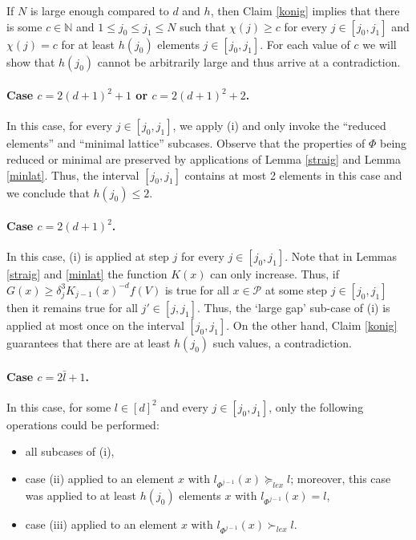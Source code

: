 \documentclass{daj}
\renewcommand{\le}{\leqslant}
\renewcommand{\ge}{\geqslant}
\newcommand{\N}{\mathbb N}
\renewcommand{\P}{\mathcal P}
\theoremstyle{definition}
\theoremstyle{remark}
\theoremstyle{definition}
\theoremstyle{definition}
\begin{document}
If $N$ is large enough compared to $d$ and $h$, then Claim \ref{konig} implies that there is some $c \in \N$ and $1\le j_0 \le j_1 \le N$ such that $\chi(j) \ge c$ for every $j \in [j_0, j_1]$ and $\chi(j) = c$ for at least $h(j_0)$ elements $j \in [j_0, j_1]$. For each value of $c$ we will show that $h(j_0)$ cannot be arbitrarily large and thus arrive at a contradiction. 

\paragraph{Case $c = 2(d+1)^2 +1$ or $c=2(d+1)^2 +2$.} In this case, for every $j \in [j_0, j_1]$, we apply (i) and only invoke the ``reduced elements'' and ``minimal lattice'' subcases.
Observe that the properties of $\Phi$ being reduced or minimal are preserved by applications of Lemma \ref{straig} and Lemma \ref{minlat}. Thus, the interval $[j_0, j_1]$ contains at most 2 elements in this case and we conclude that $h(j_0)\le 2$. 
\paragraph{Case $c = 2(d+1)^2$.} In this case, (i) is applied at step $j$ for every $j \in [j_0, j_1]$. Note that in Lemmas \ref{straig} and \ref{minlat} the function $K(x)$ can only increase. Thus, if $G(x) \ge \delta_j^3 K_{j-1}(x)^{-d} f(V)$ is true for all $x\in \P$ at some step $j \in [j_0, j_1]$ then it remains true for all $j' \in [j, j_1]$. Thus, the `large gap' sub-case of (i) is applied at most once on the interval $[j_0, j_1]$. On the other hand, Claim \ref{konig} guarantees that there are at least $h(j_0)$ such values, a contradiction.
\paragraph{Case $c = 2\bar l+1$.} In this case, for some $l \in [d]^2$ and every $j \in [j_0, j_1]$, only the following operations could be performed: 
\begin{itemize}
    \item all subcases of (i),
    \item case (ii) applied to an element $x$ with $l_{\Phi^{j-1}}(x) \succeq_{lex} l$; moreover, this case was applied to at least $h(j_0)$ elements $x$ with $l_{\Phi^{j-1}}(x) = l$,
    \item case (iii) applied to an element $x$ with $l_{\Phi^{j-1}}(x) \succ_{lex} l$.
\end{itemize} 
\end{document}
